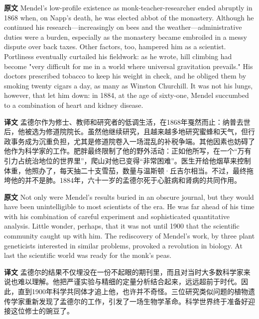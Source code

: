 \documentclass[UTF8,zihao=-4]{ctexart}
\newcommand{\BodyFont}{\fontsize{10.5pt}{15.5pt}\selectfont}
\renewenvironment{quote}{\par\noindent\begingroup\BodyFont}{\par\endgroup}
\begin{document}
\begin{quote}
\noindent\textbf{原文} Mendel's low-profile existence as monk-teacher-researcher ended abruptly in 1868 when, on Napp's death, he was elected abbot of the monastery. Although he continued his research---increasingly on bees and the weather---administrative duties were a burden, especially as the monastery became embroiled in a messy dispute over back taxes. Other factors, too, hampered him as a scientist. Portliness eventually curtailed his fieldwork: as he wrote, hill climbing had become "very difficult for me in a world where universal gravitation prevails." His doctors prescribed tobacco to keep his weight in check, and he obliged them by smoking twenty cigars a day, as many as Winston Churchill. It was not his lungs, however, that let him down: in 1884, at the age of sixty-one, Mendel succumbed to a combination of heart and kidney disease.

\smallskip
\noindent\textbf{译文} 孟德尔作为修士、教师和研究者的低调生活，在1868年戛然而止：纳普去世后，他被选为修道院院长。虽然他继续研究，且越来越多地研究蜜蜂和天气，但行政事务成为沉重负担，尤其是修道院卷入一场混乱的补税争端。其他因素也妨碍了他作为科学家的工作。肥胖最终限制了他的野外活动：正如他所写，在一个“万有引力占统治地位的世界里”，爬山对他已变得“非常困难”。医生开给他烟草来控制体重，他照办了，每天抽二十支雪茄，数量与温斯顿·丘吉尔相当。不过，最终拖垮他的并不是肺。1884年，六十一岁的孟德尔死于心脏病和肾病的共同作用。
\end{quote}

\begin{quote}
\noindent\textbf{原文} Not only were Mendel's results buried in an obscure journal, but they would have been unintelligible to most scientists of the era. He was far ahead of his time with his combination of careful experiment and sophisticated quantitative analysis. Little wonder, perhaps, that it was not until 1900 that the scientific community caught up with him. The rediscovery of Mendel's work, by three plant geneticists interested in similar problems, provoked a revolution in biology. At last the scientific world was ready for the monk's peas.

\smallskip
\noindent\textbf{译文} 孟德尔的结果不仅埋没在一份不起眼的期刊里，而且对当时大多数科学家来说也难以理解。他把严谨实验与精细的定量分析结合起来，远远超前于时代。因此，直到1900年科学共同体才追上他，也许并不奇怪。三位研究类似问题的植物遗传学家重新发现了孟德尔的工作，引发了一场生物学革命。科学世界终于准备好迎接这位修士的豌豆了。
\end{quote}
\end{document}
